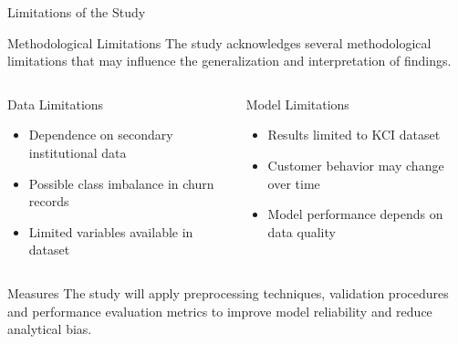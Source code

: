 \documentclass[10pt]{beamer}
\begin{document}
\begin{frame}{Limitations of the Study}
	
	\small
	
	\begin{block}{Methodological Limitations}
		The study acknowledges several methodological limitations that may influence the generalization and interpretation of findings.
	\end{block}
	
	\vspace{0.3cm}
	
	\begin{columns}
		

		
		\begin{alertblock}{Data Limitations}
			\begin{itemize}
				\item Dependence on secondary institutional data
				
				\item Possible class imbalance in churn records
				
				\item Limited variables available in dataset
			\end{itemize}
		\end{alertblock}
		

		
		\begin{exampleblock}{Model Limitations}
			\begin{itemize}
				\item Results limited to KCI dataset
				
				\item Customer behavior may change over time
				
				\item Model performance depends on data quality
			\end{itemize}
		\end{exampleblock}
		
	\end{columns}
	
	\vspace{0.3cm}
	
	\begin{block}{Measures}
		The study will apply preprocessing techniques, validation procedures and performance evaluation metrics to improve model reliability and reduce analytical bias.
	\end{block}
	
\end{frame}
\end{document}
